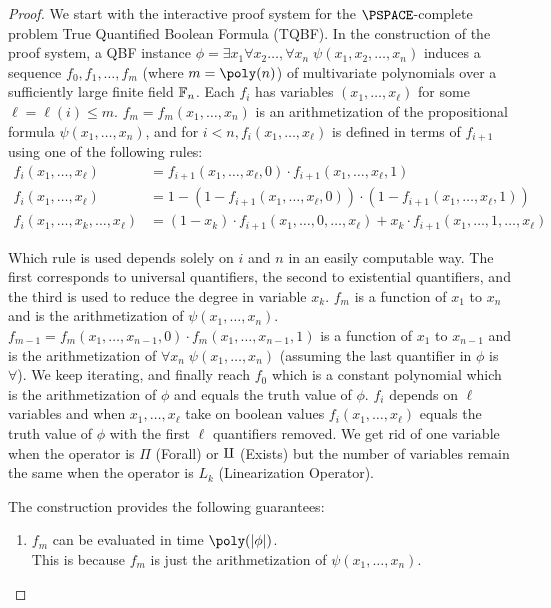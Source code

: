 \begin{proof}
We start with the interactive proof system for the $\PSPACE$-complete problem True Quantified Boolean Formula (TQBF). In the construction of the proof system, a QBF instance 
$\phi = \exists x_1 \forall x_2 \ldots , \forall x_n \; \psi(x_1,x_2, \ldots, x_n)$ induces a sequence $f_0, f_1, \ldots , f_m$ (where $m = \poly(n)$) of multivariate polynomials over a sufficiently large finite field $\mathbb{F}_n$. 
Each $f_i$ has variables $(x_1, \dots, x_{\ell})$ for some $\ell = \ell(i) \leq m$. 
$f_m = f_m(x_1, \ldots , x_n)$ is an arithmetization of the propositional formula $\psi(x_1, \ldots , x_n)$, and for $i < n, f_i( x_1, \ldots , x_{\ell})$ is defined in terms of $f_{i+1}$ using one of the following rules:
\begin{align*}
	f_i(x_1, \ldots, x_{\ell}) &= f_{i+1}(x_1, \ldots, x_{\ell},0) \cdot f_{i+1}(x_1, \ldots, x_{\ell},1) \tag{Forall} \\
	f_i(x_1, \ldots, x_{\ell}) &= 1- ( 1- f_{i+1}(x_1, \ldots, x_{\ell},0) ) \cdot ( 1- f_{i+1}(x_1, \ldots, x_{\ell},1) ) \tag{Exists}	\\
	f_i(x_1, \ldots, x_k, \ldots, x_{\ell}) &= (1-x_k) \cdot f_{i+1}(x_1, \ldots, 0, \ldots, x_{\ell}) + x_k \cdot f_{i+1}(x_1, \ldots, 1, \ldots, x_{\ell}) \tag{Linearization}
\end{align*}

Which rule is used depends solely on $i$ and $n$ in an easily computable way. The first corresponds to universal quantifiers, the second to existential quantifiers, and the third is used to reduce the degree in variable $x_k$.
$f_m$ is a function of $x_1$ to $x_n$ and is the arithmetization of $\psi(x_1, \ldots , x_n)$. $f_{m-1}=f_{m}(x_1, \ldots, x_{n-1},0) \cdot f_{m}(x_1, \ldots, x_{n-1},1)$ is a function of $x_1$ to $x_{n-1}$ and is the arithmetization of $\forall x_n \; \psi(x_1, \ldots , x_n)$ (assuming the last quantifier in $\phi$ is $\forall$). We keep iterating, and finally reach $f_0$ which is a constant polynomial which is the arithmetization of $\phi$ and equals the truth value of $\phi$. $f_i$ depends on $\ell$ variables and when $x_1, \ldots , x_{\ell}$ take on boolean values $f_i(x_1, \ldots , x_{\ell})$ equals the truth value of $\phi$ with the first $\ell$ quantifiers removed.
We get rid of one variable when the operator is $\Pi$ (Forall) or $\antipi$ (Exists) but the number of variables remain the same when the operator is $L_k$ (Linearization Operator).

The construction provides the following guarantees:
\begin{enumerate}
	\item $f_m$ can be evaluated in time $\poly(\card{\phi})$. \\
	This is because $f_m$ is just the arithmetization of $\psi(x_1, \ldots , x_n)$.
	

\end{enumerate}
\end{proof}
